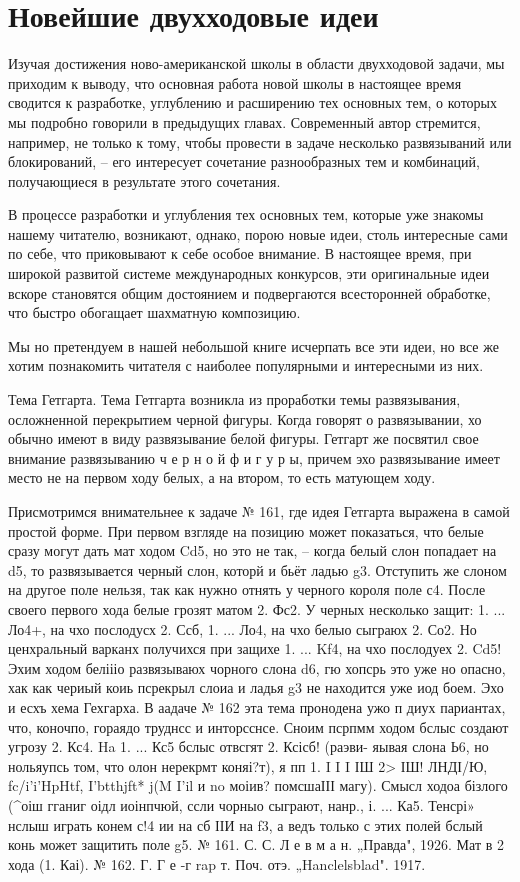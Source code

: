 \chapter{Новейшие двухходовые идеи}

Изучая достижения ново-американской школы в области двухходовой задачи, мы приходим к выводу, что основная работа новой школы в настоящее время сводится к разработке, углублению и расширению тех основных тем, о которых мы подробно говорили в предыдущих главах. Современный автор стремится, например, не только к тому, чтобы провести в задаче несколько развязываний или блокирований, -- его интересует сочетание разнообразных тем и комбинаций, получающиеся в результате этого сочетания.

В процессе разработки и углубления тех основных тем, которые уже знакомы нашему читателю, возникают, однако, порою новые идеи, столь интересные сами по себе, что приковывают к себе особое внимание. В настоящее время, при широкой развитой системе международных конкурсов, эти оригинальные идеи вскоре становятся общим достоянием и подвергаются всесторонней обработке, что быстро обогащает шахматную композицию.

Мы но претендуем в нашей небольшой книге исчерпать все эти идеи, но все же хотим познакомить читателя с наиболее популярными и интересными из них.

Тема Гетгарта. Тема Гетгарта возникла из проработки темы развязывания, осложненной перекрытием черной фигуры. Когда говорят о развязывании, хо обычно имеют в виду развязывание белой фигуры. Гетгарт же посвятил свое внимание развязыванию ч е р н о й ф и г у р ы, причем эхо развязывание имеет место не на первом ходу белых, а на втором, то есть матующем ходу.

Присмотримся внимательнее к задаче № 161, где идея Гетгарта выражена в самой простой форме. При первом взгляде 
на позицию может показаться, что белые сразу могут дать мат ходом Cd5, но это не так, -- когда белый слон попадает на 
d5, то развязывается черный слон, которй и бьёт ладью g3. Отступить же слоном на другое поле нельзя, так как нужно 
отнять у черного короля поле с4. После своего первого хода белые грозят матом 2. Фс2. У черных несколько защит:
1. ... Ло4+, на чхо послодусх 2. Ссб, 1. ... Ло4, на чхо белыо сыграюх 2. Со2. Но ценхральный варканх получихся при защихе
1. ... Kf4, на чхо послодуех 2. Cd5! Эхим ходом беліііо развязываюх чорного слона d6, гю хопсрь это уже но опасно, хак 
как чериый коиь псрекрыл слоиа и ладья g3 не находится уже иод боем. Эхо и есхъ хема Гехгарха.
     В аадаче № 162 эта тема пронодена ужо п диух париантах, что, коночпо, гораядо труднсс и инторсснсе. Сноим 
псрпмм ходом бслыс создают угрозу 2. Кс4. Ha 1. ... Кс5 бслыс отвсгят 2. Ксісб! (раэви- яывая слона Ь6, но нольяупсь том, 
что олон нерекрмт коняі?т), я пп
1. I I I ІШ 2> ІШ!	ЛНДІ/Ю, fc/i'i'HpHtf,	I'btthjft*	j(M I'il
и no моіив? помсшаІІІ магу). Смысл ходоа бізлого (^оіш гганиг оідл иоінпчюй, ссли чорныо сыграют, нанр., і. ... Ка5. Тенсрі» 
нслыш играть конем с!4 ии на сб ІІИ на f3, а ведъ только с этих полей бслый конь может защитить поле g5.
№ 161. С. С. Л е в м а н. „Правда", 1926.
Мат в 2 хода (1. Каі).
	№ 162. Г. Г е -г rap т. Поч. отэ. „Hanclelsblad". 1917.


